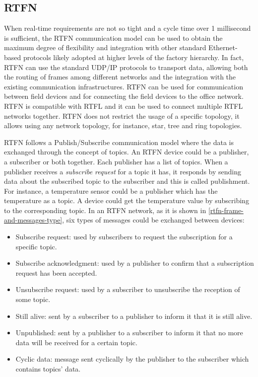 \subsection{RTFN}

When real-time requirements are not so tight and a cycle time over 1 millisecond is sufficient, the \ac{RTFN} communication model
can be used to obtain the maximum degree of flexibility and integration with other
standard Ethernet-based protocols likely adopted at higher levels of the factory hierarchy. In fact, \ac{RTFN}
can use the standard \ac{UDP}/\ac{IP}  protocols to transport data, allowing both the routing of frames among
different networks and the integration with the existing communication infrastructures. \ac{RTFN}
can be used for communication between field devices and for connecting the field devices to
the office network. \ac{RTFN} is compatible with \ac{RTFL} and it can be used to connect multiple \ac{RTFL} networks together.
\ac{RTFN} does not restrict the usage of a specific topology, it allows using any network topology, for
instance, star, tree and ring topologies.

\ac{RTFN} follows a Publish/Subscribe communication model where the data is exchanged through
the concept of topics. An \ac{RTFN} device could be a publisher, a subscriber or both together.
Each publisher has a list of topics. When a publisher receives a \textit{subscribe request} for a topic it has,
it responds by sending data about the subscribed topic to the subscriber and this is called publishment.
For instance, a temperature sensor could be a publisher which has the temperature as a topic. A device
could get the temperature value by subscribing to the corresponding topic.
In an \ac{RTFN} network, as it is shown in \autoref{rtfn-frame-and-messages-type}, six types of messages
could be exchanged between devices:
\begin{itemize}
\setlength{\labelwidth}{10pt}
  \item Subscribe request: used by subscribers to request the subscription for a specific topic.
  \item Subscribe acknowledgment: used by a publisher to confirm that a subscription request has been accepted.
  \item Unsubscribe request: used by a subscriber to unsubscribe the reception of some topic.
  \item Still alive: sent by a subscriber to a publisher to inform it that it is still alive.
  \item Unpublished: sent by a publisher to a subscriber to inform it that no more data will be received for a certain topic.
  \item Cyclic data: message sent cyclically by the publisher to the subscriber which contains topics' data.
\end{itemize}

